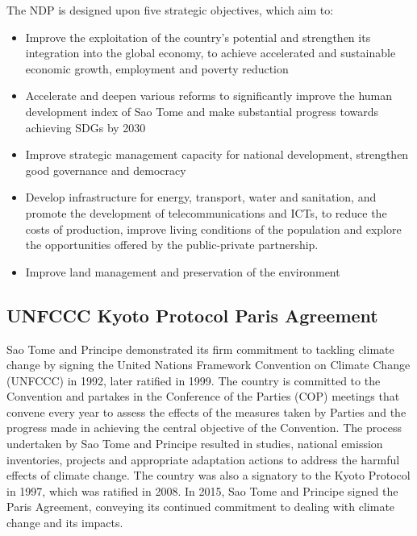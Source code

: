 \documentclass[
]{book}
\providecommand{\tightlist}{%
  \setlength{\itemsep}{0pt}\setlength{\parskip}{0pt}}
\begin{document}
The NDP is designed upon five strategic objectives, which aim to:

\begin{itemize}
\tightlist
\item
  Improve the exploitation of the country's potential and strengthen its integration into the global economy, to achieve accelerated and sustainable economic growth, employment and poverty reduction
\item
  Accelerate and deepen various reforms to significantly improve the human development index of Sao Tome and make substantial progress towards achieving SDGs by 2030
\item
  Improve strategic management capacity for national development, strengthen good governance and democracy
\item
  Develop infrastructure for energy, transport, water and sanitation, and promote the development of telecommunications and ICTs, to reduce the costs of production, improve living conditions of the population and explore the opportunities offered by the public-private partnership.
\item
  Improve land management and preservation of the environment
\end{itemize}

\hypertarget{unfccc-kyoto-protocol-paris-agreement-1}{%
\subsection{UNFCCC \textbar{} Kyoto Protocol \textbar{} Paris Agreement}\label{unfccc-kyoto-protocol-paris-agreement-1}}

Sao Tome and Principe demonstrated its firm commitment to tackling climate change by signing the United Nations Framework Convention on Climate Change (UNFCCC) in 1992, later ratified in 1999. The country is committed to the Convention and partakes in the Conference of the Parties (COP) meetings that convene every year to assess the effects of the measures taken by Parties and the progress made in achieving the central objective of the Convention. The process undertaken by Sao Tome and Principe resulted in studies, national emission inventories, projects and appropriate adaptation actions to address the harmful effects of climate change. The country was also a signatory to the Kyoto Protocol in 1997, which was ratified in 2008. In 2015, Sao Tome and Principe signed the Paris Agreement, conveying its continued commitment to dealing with climate change and its impacts.
\end{document}
